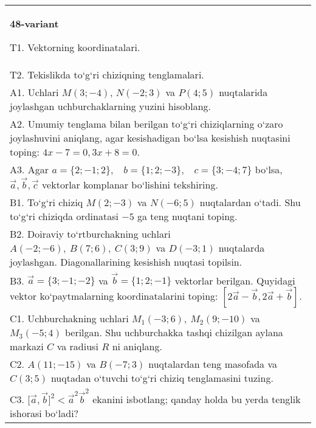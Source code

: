 \documentclass{article}
\begin{document}
\begin{tabular}{m{17cm}}
\textbf{48-variant}
\newline

T1. 
Vektorning koordinatalari.
 \\
T2. 
Tekislikda to‘g‘ri chiziqning tenglamalari.
 \\
A1. 
Uchlari $M (3;-4) $, $N (-2;3) $ va $P (4;5) $
nuqtalarida joylashgan uchburchaklarning yuzini hisoblang.
 \\
A2. 
Umumiy tenglama bilan berilgan to‘g‘ri chiziqlarning
o‘zaro joylashuvini aniqlang, agar kesishadigan bo‘lsa kesishish nuqtasini
toping: $4x-7=0, 3x+8=0$.
 \\
A3. 
Agar \(a = \{ 2; - 1;2\}, \ \ \ \ b = \{ 1;2; - 3\}, \ \ \ \ c = \{ 3; - 4;7\}\) bo‘lsa, $\overrightarrow{a}, \overrightarrow{b}, \overrightarrow{c}$ vektorlar komplanar bo‘lishini tekshiring. \\
B1. 
To‘g‘ri chiziq \(M (2;-3) \) va \(N (-6;5) \) nuqtalardan o‘tadi.
Shu to‘g‘ri chiziqda ordinatasi $-5$ ga teng nuqtani toping.
 \\
B2. 
Doiraviy to‘rtburchakning uchlari
\(A (-2;-6),\ B (7;6),\ C (3;9) \) va \(D (-3;1) \) nuqtalarda
joylashgan. Diagonallarining kesishish nuqtasi topilsin.
 \\
B3. 
$\vec{a} = \{ 3; - 1; - 2\}$ va $\vec{b} = \{ 1;2; - 1\}$ vektorlar berilgan. Quyidagi vektor ko‘paytmalarning koordinatalarini toping:
$\left\lbrack 2\vec{a} - \vec{b},2\vec{a} + \vec{b} \right\rbrack$.
 \\
C1. 
Uchburchakning uchlari \(M_{1} (- 3;6),\ M_{2} (9; - 10) \)
va \(M_{3} (-5;4) \) berilgan. Shu uchburchakka tashqi chizilgan
aylana markazi $C$ va radiusi $R$ ni aniqlang.
 \\
C2. 
\(A (11; - 15) \) va \(B (-7;3) \) nuqtalardan
teng masofada va \(C (3; 5) \) nuqtadan o‘tuvchi to‘g‘ri chiziq tenglamasini
tuzing.
 \\
C3. 
\(\lbrack\vec{a},\vec{b}\rbrack^{2} < {\vec{a}}^{2}{\vec{b}}^{2}\) ekanini isbotlang; qanday holda bu yerda tenglik ishorasi bo‘ladi?
 \\

\end{tabular}
\vspace{1cm}
\end{document}
